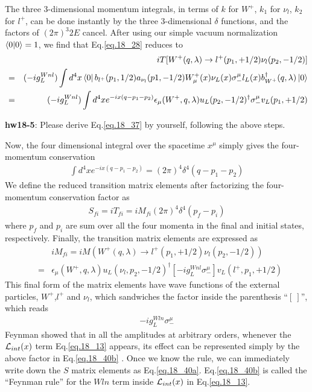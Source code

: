 \documentclass[12pt]{article}
\def\dgr{\dagger}
\def\eps{\epsilon}
\def\lmd{\lambda}
\begin{document}
The three 3-dimensional momentum integrals, in terms of $k$ for $W^+$,
$k_1$ for $\nu_l$, $k_2$ for $l^+$, can be done instantly by the three
3-dimensional $\delta$ functions, and the factors of $(2\pi)^3 2E$ cancel.
After using our simple vacuum normalization $\bra{0}\ket{0}=1$,
we find that Eq.\ref{eq.18_28} reduces to
\begin{eqnarray}
 &&   iT[W^+(q,\lmd) \to l^+(p_1,+1/2) \nu_l(p_2,-1/2)] \nonumber \\
&=& (-ig_L^{Wnl}) \int d^4x
\bra{0} b_{l^+}(p_1,1/2) a_{\nu_l}(p1,-1/2)
    W^+_\mu(x) \nu_L(x) \sigma_-^\mu l_L(x)
                                b^\dagger_{W^+}(q,\lmd) \ket{0}\\ 
&=& (-ig_L^{Wnl}) \int d^4x e^{-ix(q-p_1-p_2)}
\eps_\mu(W^+,q,\lmd) u_L(p_2,-1/2)^\dgr \sigma_-^\mu v_L(p_1,+1/2) \label{eq.18_37}
\end{eqnarray}

{\bf hw18-5}: Please derive Eq.\ref{eq.18_37} by yourself, following the above steps.

Now, the four dimensional integral over the spacetime $x^\mu$ simply
gives the four-momentum conservation
\begin{eqnarray}
    \int d^4x e^{-ix(q-p_1-p_2)} = (2\pi)^4 \delta^4(q-p_1-p_2) \label{eq.18_38}
\end{eqnarray}
We define the reduced transition matrix elements after factorizing the
four-momentum conservation factor as
\begin{eqnarray}
    S_{fi}= i T_{fi} = i M_{fi} (2\pi)^4 \delta^4(p_f-p_i) \label{eq.18_39}
\end{eqnarray}
where $p_f$ and $p_i$ are sum over all the four momenta in the final and
initial states, respectively. Finally, the transition matrix elements
are expressed as
\begin{eqnarray}
  &&  i M_{fi}
= i M(W^+(q,\lmd) \to l^+(p_1,+1/2) \nu_l(p_2,-1/2))\\
&=& \eps_\mu(W^+,q,\lmd)
u_L(\nu_l,p_2,-1/2)^\dgr [ -ig_L^{Wnl} \sigma_-^\mu ] v_L(l^+,p_1,+1/2) \label{eq.18_40a}
\end{eqnarray}
This final form of the matrix elements have wave functions of the
external particles, $W^+$,$l^+$ and $\nu_l$, which sandwiches the factor
inside the parenthesis ``$[ ~]$'', which reads
\begin{eqnarray}
    -ig_L^{Wln} \sigma_-^\mu \label{eq.18_40b}
\end{eqnarray}
Feynman showed that in all the amplitudes at arbitrary orders, whenever
the ${\cal L}_{int}(x)$ term Eq.\ref{eq.18_13} appears, its effect can be represented simply by the above factor in Eq.\ref{eq.18_40b} .
Once we know the rule, we can immediately write down the $S$ matrix
elements as Eq.\ref{eq.18_40a}. Eq.\ref{eq.18_40b} is called the ``Feynman rule'' for the $Wln$ term inside ${\cal L}_{int}(x)$ in Eq.\ref{eq.18_13}.
\end{document}
